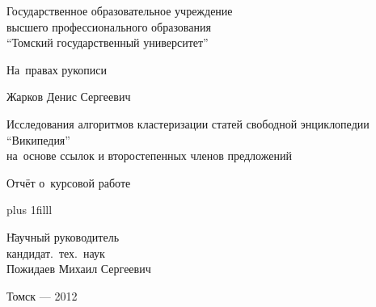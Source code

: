
\thispagestyle{empty}
\begin{center}
Государственное образовательное учреждение\\
высшего профессионального образования\\
``Томский государственный университет''
\end{center}

\vspace{1cm}

\begin{flushright}
На~правах рукописи
\end{flushright}

\vspace{1cm}

\begin{center}

Жарков Денис Сергеевич

\vspace{1cm}

Исследования алгоритмов кластеризации статей свободной энциклопедии ``Википедия'' \\
на~основе ссылок и второстепенных членов предложений

\vspace{2.0cm}

Отчёт о~курсовой работе

\end{center}

\vskip 0pt plus 1filll

\begin{tabbing}
\hspace{10cm} \= Научный руководитель\\
\> кандидат.~тех.~наук\\
\> Пожидаев Михаил Сергеевич\\
\end{tabbing}

\vspace*{1cm}

\begin{center}
Томск --- 2012
\end{center}
